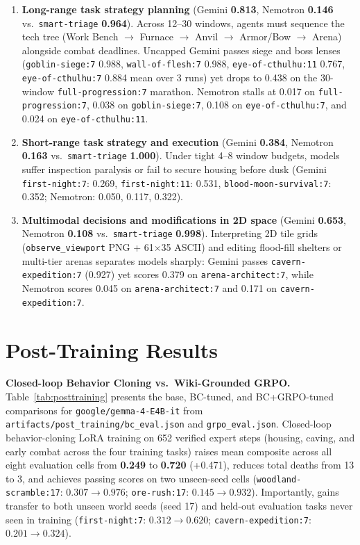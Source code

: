 \documentclass[10pt,letterpaper]{article}
\begin{document}
\begin{enumerate}[leftmargin=18pt,itemsep=3pt]
  \item \textbf{Long-range task strategy planning} (Gemini \textbf{0.813}, Nemotron \textbf{0.146} vs.\ \texttt{smart-triage} \textbf{0.964}). Across 12--30 windows, agents must sequence the tech tree (Work Bench $\to$ Furnace $\to$ Anvil $\to$ Armor/Bow $\to$ Arena) alongside combat deadlines. Uncapped Gemini passes siege and boss lenses (\texttt{goblin-siege:7} 0.988, \texttt{wall-of-flesh:7} 0.988, \texttt{eye-of-cthulhu:11} 0.767, \texttt{eye-of-cthulhu:7} 0.884 mean over 3 runs) yet drops to 0.438 on the 30-window \texttt{full-progression:7} marathon. Nemotron stalls at 0.017 on \texttt{full-progression:7}, 0.038 on \texttt{goblin-siege:7}, 0.108 on \texttt{eye-of-cthulhu:7}, and 0.024 on \texttt{eye-of-cthulhu:11}.
  \item \textbf{Short-range task strategy and execution} (Gemini \textbf{0.384}, Nemotron \textbf{0.163} vs.\ \texttt{smart-triage} \textbf{1.000}). Under tight 4--8 window budgets, models suffer inspection paralysis or fail to secure housing before dusk (Gemini \texttt{first-night:7}: 0.269, \texttt{first-night:11}: 0.531, \texttt{blood-moon-survival:7}: 0.352; Nemotron: 0.050, 0.117, 0.322).
  \item \textbf{Multimodal decisions and modifications in 2D space} (Gemini \textbf{0.653}, Nemotron \textbf{0.108} vs.\ \texttt{smart-triage} \textbf{0.998}). Interpreting 2D tile grids (\texttt{observe\_viewport} PNG + 61$\times$35 ASCII) and editing flood-fill shelters or multi-tier arenas separates models sharply: Gemini passes \texttt{cavern-expedition:7} (0.927) yet scores 0.379 on \texttt{arena-architect:7}, while Nemotron scores 0.045 on \texttt{arena-architect:7} and 0.171 on \texttt{cavern-expedition:7}.
\end{enumerate}

\section{Post-Training Results}

\textbf{Closed-loop Behavior Cloning vs.\ Wiki-Grounded GRPO.} Table~\ref{tab:posttraining} presents the base, BC-tuned, and BC+GRPO-tuned comparisons for \texttt{google/gemma-4-E4B-it} from \texttt{artifacts/post\_training/bc\_eval.json} and \texttt{grpo\_eval.json}. Closed-loop behavior-cloning LoRA training on 652 verified expert steps (housing, caving, and early combat across the four training tasks) raises mean composite across all eight evaluation cells from \textbf{0.249} to \textbf{0.720} (+0.471), reduces total deaths from 13 to 3, and achieves passing scores on two unseen-seed cells (\texttt{woodland-scramble:17}: $0.307 \to 0.976$; \texttt{ore-rush:17}: $0.145 \to 0.932$). Importantly, gains transfer to both unseen world seeds (seed 17) and held-out evaluation tasks never seen in training (\texttt{first-night:7}: $0.312 \to 0.620$; \texttt{cavern-expedition:7}: $0.201 \to 0.324$).
\end{document}
